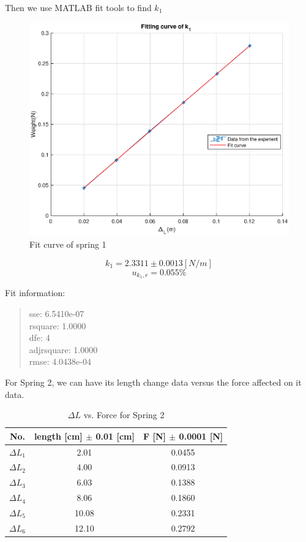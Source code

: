 Then we use MATLAB fit tools to find $k_1$

\begin{figure}[H]
\centering
\includegraphics[width=15cm]{matlab/fitfig/k1}
\caption{Fit curve of spring 1}
\end{figure}

$$k_1 = 2.3311 \pm 0.0013 [N/m] $$
$$ u_{k_1,r} = 0.055 \% $$

Fit information: 
\begin{quote}
\centering
sse: 6.5410e-07 \\
rsquare: 1.0000 \\
dfe: 4 \\
adjrsquare: 1.0000 \\
rmse: 4.0438e-04 \\
\end{quote}


For Spring 2, we can have its length change data versus the force affected on it
data.  

\begin{table}[H]
\centering
\begin{tabular}{|c|c|c|}
\hline
No. & length [cm] $\pm$ 0.01 [cm] & F [N] $\pm$ 0.0001 [N] \\ \hline
$\Delta L_1$ & 2.01  &  0.0455  \\ \hline
$\Delta L_2$ & 4.00  &  0.0913  \\ \hline
$\Delta L_3$ & 6.03  &  0.1388  \\ \hline
$\Delta L_4$ & 8.06  &  0.1860  \\ \hline
$\Delta L_5$ & 10.08 &  0.2331  \\ \hline
$\Delta L_6$ & 12.10 &  0.2792  \\ \hline
\end{tabular}
\caption{$\Delta L$  vs. Force for Spring 2}
\label{s2df}
\end{table}

